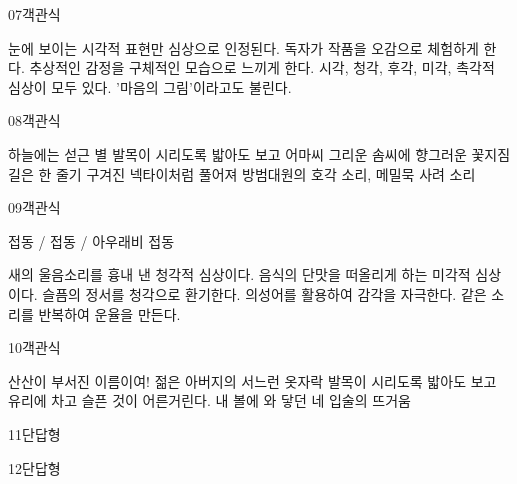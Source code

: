 \documentclass[fs9,seriesFre]{korfarm-base}
\begin{document}
\begin{kfQBlock}{07}{객관식}
\begin{kfChoices}
\kfChoice 눈에 보이는 시각적 표현만 심상으로 인정된다.
\kfChoice 독자가 작품을 오감으로 체험하게 한다.
\kfChoice 추상적인 감정을 구체적인 모습으로 느끼게 한다.
\kfChoice 시각, 청각, 후각, 미각, 촉각적 심상이 모두 있다.
\kfChoice '마음의 그림'이라고도 불린다.
\end{kfChoices}
\end{kfQBlock}
\begin{kfQBlock}{08}{객관식}
\begin{kfChoices}
\kfChoice 하늘에는 섣근 별
\kfChoice 발목이 시리도록 밟아도 보고
\kfChoice 어마씨 그리운 솜씨에 향그러운 꽃지짐
\kfChoice 길은 한 줄기 구겨진 넥타이처럼 풀어져
\kfChoice 방범대원의 호각 소리, 메밀묵 사려 소리
\end{kfChoices}
\end{kfQBlock}
\begin{kfQBlock}{09}{객관식}
\begin{kfEvidence}접동 / 접동 / 아우래비 접동\end{kfEvidence}
\begin{kfChoices}
\kfChoice 새의 울음소리를 흉내 낸 청각적 심상이다.
\kfChoice 음식의 단맛을 떠올리게 하는 미각적 심상이다.
\kfChoice 슬픔의 정서를 청각으로 환기한다.
\kfChoice 의성어를 활용하여 감각을 자극한다.
\kfChoice 같은 소리를 반복하여 운율을 만든다.
\end{kfChoices}
\end{kfQBlock}
\begin{kfQBlock}{10}{객관식}
\begin{kfChoices}
\kfChoice 산산이 부서진 이름이여!
\kfChoice 젊은 아버지의 서느런 옷자락
\kfChoice 발목이 시리도록 밟아도 보고
\kfChoice 유리에 차고 슬픈 것이 어른거린다.
\kfChoice 내 볼에 와 닿던 네 입술의 뜨거움
\end{kfChoices}
\end{kfQBlock}
\begin{kfQBlock}{11}{단답형}
\end{kfQBlock}
\begin{kfQBlock}{12}{단답형}
\end{kfQBlock}
\end{document}
